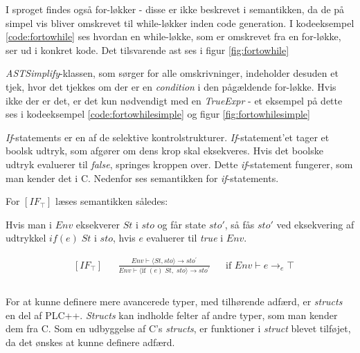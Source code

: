 \noindent I sproget findes også for-løkker - disse er ikke beskrevet i semantikken, da de på simpel vis bliver omskrevet til while-løkker inden code generation. I kodeeksempel \ref{code:fortowhile} ses hvordan en while-løkke, som er omskrevet fra en for-løkke, ser ud i konkret kode. Det tilsvarende \gls{ast} ses i figur \ref{fig:fortowhile}



\noindent \textit{ASTSimplify}-klassen, som sørger for alle omskrivninger, indeholder desuden et tjek, hvor det tjekkes om der er en \textit{condition} i den pågældende for-løkke. Hvis ikke der er det, er det kun nødvendigt med en \textit{TrueExpr} - et eksempel på dette ses i kodeeksempel \ref{code:fortowhilesimple} og figur \ref{fig:fortowhilesimple}



\textit{If}-statements er en af de selektive kontrolstrukturer. \textit{If}-statement'et tager et boolsk udtryk, som afgører om dens krop skal eksekveres. Hvis det boolske udtryk evaluerer til \textit{false}, springes kroppen over. Dette \textit{if}-statement fungerer, som man kender det i C. Nedenfor ses semantikken for \textit{if}-statements.

\noindent For $[IF_\top]$ læses semantikken således: 

Hvis man i $Env$ eksekverer $St$ i $sto$ og får state $sto'$, så fås $sto'$ ved eksekvering af udtrykkel $if(e)\; St$ i $sto$, hvis $e$ evaluerer til \textit{true} i $Env$.

\begin{align*}
&[IF_\top] & &\frac{Env \vdash \langle St, sto \rangle \rightarrow sto^\prime}{Env \vdash \langle \text{if } (e)\; St,\; sto \rangle \rightarrow sto^\prime} & &\text{if } Env \vdash e \rightarrow_e \top\\\\
\end{align*}

For at kunne definere mere avancerede typer, med tilhørende adfærd, er \textit{structs} en del af PLC++. \textit{Structs} kan indholde felter af andre typer, som man kender dem fra C. Som en udbyggelse af C's \textit{structs}, er funktioner i \textit{struct} blevet tilføjet, da det ønskes at kunne definere adfærd.


